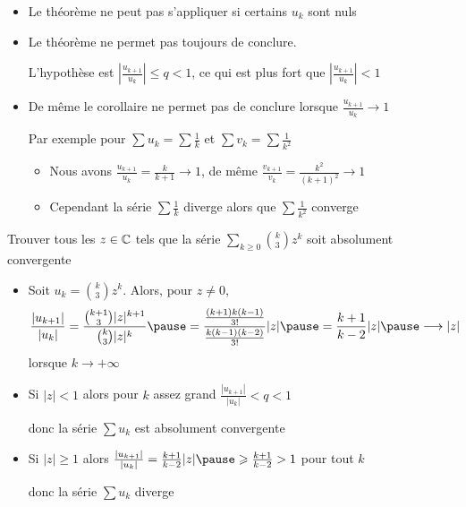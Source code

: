 \begin{frame}

\begin{remarque}
\begin{itemize}
  \item\pause Le théorème ne peut pas s'appliquer si certains $u_k$ sont nuls
  \item\pause Le théorème ne permet pas toujours de conclure.
  
L'hypothèse est $\left|\frac{u_{k+1}}{u_k}\right| \le q <1$, ce qui est plus fort que $\left|\frac{u_{k+1}}{u_k}\right| <1$
  
  \item\pause De même le corollaire ne permet pas de conclure lorsque $\frac{u_{k+1}}{u_k} \to 1$
  
  \pause
  Par exemple pour $\sum u_k= \sum \frac{1}{k}$ et $\sum v_k = \sum \frac{1}{k^2}$
\begin{itemize}
\item\pause  Nous avons $\frac{u_{k+1}}{u_k} = \frac{k}{k+1} \to 1$\pause ,  de même $\frac{v_{k+1}}{v_k} = \frac{k^2}{(k+1)^2 } \to 1$
\item\pause Cependant la série $\sum \frac{1}{k}$ diverge 
  alors que $\sum \frac{1}{k^2}$ converge
\end{itemize}
\end{itemize}  
\end{remarque}
\end{frame}

\begin{frame}

\begin{exemple}
Trouver tous les $z\in \mathbb{C}$ tels que la série 
$\displaystyle\sum_{k\ge0} \binom{k}{3} z^k$ soit absolument convergente

\begin{itemize}
\item \pause Soit $u_k=\binom{k}{3} z^k$. \pause Alors, pour $z\neq0$,
$$\frac{|u_{k+1}|}{|u_k|}=\frac{\binom{k+1}{3}|z|^{k+1}}{\binom{k}{3}|z|^{k}}  \pause =
\frac{\frac{(k+1)k(k-1)}{3!}}{\frac{k(k-1)(k-2)}{3!}}|z|
 \pause =\frac{k+1}{k-2}|z|
  \pause \longrightarrow |z| $$ 
lorsque $k\to+\infty$

\item \pause Si $|z|<1$ alors pour $k$ assez grand $\frac{|u_{k+1}|}{|u_k|} < q <1$

 \pause
donc la série $\sum u_k$ est absolument convergente

\item \pause Si $|z|\ge 1$ alors $\frac{|u_{k+1}|}{|u_k|}=\frac{k+1}{k-2}|z|  \pause \ge \frac{k+1}{k-2}> 1$
pour tout $k$

 \pause
donc la série $\sum u_k$  diverge
\end{itemize}  
\end{exemple}
\end{frame}

